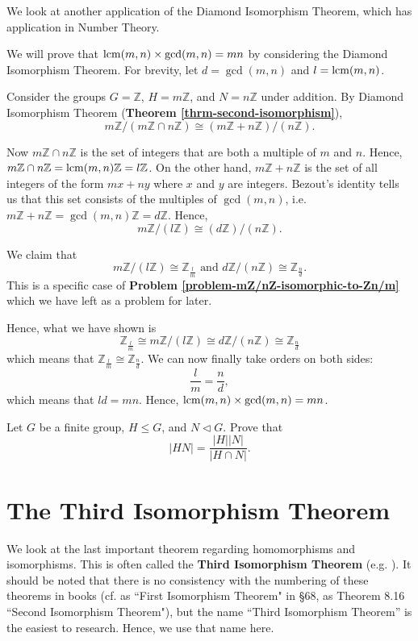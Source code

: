 We look at another application of the Diamond Isomorphism Theorem, which has application in Number Theory.
\begin{example}
    We will prove that $\mathrm{lcm}(m,n)\times\gcd(m,n) = mn$ by considering the Diamond Isomorphism Theorem. For brevity, let $d = \gcd(m,n)$ and $l = \mathrm{lcm}(m,n)$.

    Consider the groups $G = \mathbb{Z}$, $H = m\mathbb{Z}$, and $N = n\mathbb{Z}$ under addition. By Diamond Isomorphism Theorem (\textbf{Theorem \ref{thrm-second-isomorphism}}),
    \[
        m\mathbb{Z}/(m\mathbb{Z} \cap n\mathbb{Z}) \cong (m\mathbb{Z} + n\mathbb{Z})/(n\mathbb{Z}).
    \]

    Now $m\mathbb{Z} \cap n\mathbb{Z}$ is the set of integers that are both a multiple of $m$ and $n$. Hence, $m\mathbb{Z} \cap n\mathbb{Z} = \mathrm{lcm}(m,n)\mathbb{Z} = l\mathbb{Z}$. On the other hand, $m\mathbb{Z} + n\mathbb{Z}$ is the set of all integers of the form $mx+ny$ where $x$ and $y$ are integers. Bezout's identity tells us that this set consists of the multiples of $\gcd(m,n)$, i.e. $m\mathbb{Z} + n\mathbb{Z} = \gcd(m,n)\mathbb{Z} = d\mathbb{Z}$. Hence,
    \[
        m\mathbb{Z}/(l\mathbb{Z}) \cong (d\mathbb{Z})/(n\mathbb{Z}).
    \]

    We claim that
    \[
        m\mathbb{Z} / (l\mathbb{Z}) \cong \mathbb{Z}_{\frac lm} \text{ and } d\mathbb{Z} / (n\mathbb{Z}) \cong \mathbb{Z}_{\frac nd}.
    \]
    This is a specific case of \textbf{Problem \ref{problem-mZ/nZ-isomorphic-to-Zn/m}} which we have left as a problem for later.

    Hence, what we have shown is
    \[
    \mathbb{Z}_{\frac lm} \cong m\mathbb{Z}/(l\mathbb{Z}) \cong d\mathbb{Z}/(n\mathbb{Z}) \cong \mathbb{Z}_{\frac nd}
    \]
    which means that $\mathbb{Z}_{\frac lm} \cong \mathbb{Z}_{\frac nd}$. We can now finally take orders on both sides:
    \[
        \frac{l}{m} = \frac{n}{d},
    \]
    which means that $ld = mn$. Hence, $\mathrm{lcm}(m,n)\times\gcd(m,n) = mn$.
\end{example}

\begin{exercise}\label{exercise-order-of-subgroup-product}
    Let $G$ be a finite group, $H \leq G$, and $N \lhd G$. Prove that
    \[
        |HN| = \frac{|H||N|}{|H \cap N|}.
    \]
\end{exercise}

\newpage

\section{The Third Isomorphism Theorem}
We look at the last important theorem regarding homomorphisms and isomorphisms. This is often called the \textbf{Third Isomorphism Theorem} (e.g. \cite{cohn_1982, hungerford_1980}). It should be noted that there is no consistency with the numbering of these theorems in books (cf. \cite{clark_1984} as ``First Isomorphism Theorem" in \S 68, \cite{humphreys_1996} as Theorem 8.16 ``Second Isomorphism Theorem"), but the name ``Third Isomorphism Theorem'' is the easiest to research. Hence, we use that name here.

